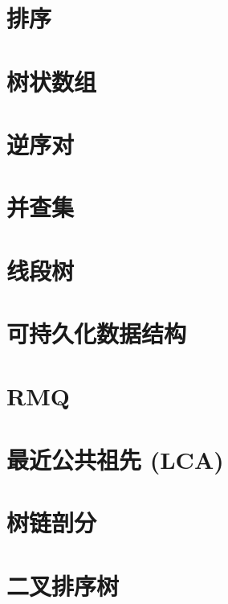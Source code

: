 \section{排序}


\section{树状数组}


\section{逆序对}


\section{并查集}


\section{线段树}


\section{可持久化数据结构}


\section{RMQ}


\section{最近公共祖先 (LCA)}


\section{树链剖分}


\section{二叉排序树}


